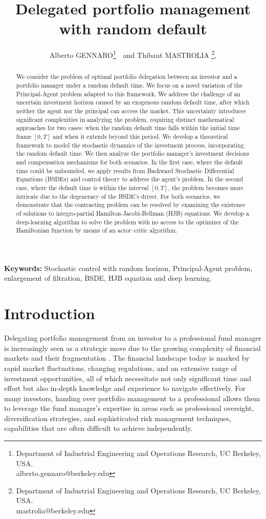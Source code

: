 \documentclass[11pt,a4paper]{article}
\title{Delegated portfolio management with random default}
\author{Alberto {\sc GENNARO}\footnote{ Department of Industrial Engineering and Operations Research, UC Berkeley, USA.\\ alberto.gennaro@berkeley.edu}~~and Thibaut {\sc MASTROLIA} \footnote{ Department of Industrial Engineering and Operations Research, UC Berkeley, USA.\\ mastrolia@berkeley.edu},}
\theoremstyle{thmstyleone}%
\theoremstyle{thmstyletwo}%
\theoremstyle{thmstylethree}%
\begin{document}
\maketitle
\begin{abstract}


We consider the problem of optimal portfolio delegation between an investor and a portfolio manager under a random default time. We focus on a novel variation of the Principal-Agent problem adapted to this framework. We address the challenge of an uncertain investment horizon caused by an exogenous random default time, after which neither the agent nor the principal can access the market. This uncertainty introduces significant complexities in analyzing the problem, requiring distinct mathematical approaches for two cases: when the random default time falls within the initial time frame $[0, T]$ and when it extends beyond this period. We develop a theoretical framework to model the stochastic dynamics of the investment process, incorporating the random default time. We then analyze the portfolio manager's investment decisions and compensation mechanisms for both scenarios. In the first case, where the default time could be unbounded, we apply results from Backward Stochastic Differential Equations (BSDEs) and control theory to address the agent's problem. In the second case, where the default time is within the interval $[0, T]$, the problem becomes more intricate due to the degeneracy of the BSDE's driver. For both scenarios, we demonstrate that the contracting problem can be resolved by examining the existence of solutions to integro-partial Hamilton-Jacobi-Bellman (HJB) equations. We develop a deep-learning algorithm to solve the problem with no access to the optimizer of the Hamiltonian function by means of an actor--critic algorithm.  
\end{abstract}
\textbf{Keywords: }{Stochastic control with random horizon, Principal-Agent problem, enlargement of filtration, BSDE, HJB equation and deep learning.}






\section{Introduction}\label{sec1}


Delegating portfolio management from an investor to a professional fund manager is increasingly seen as a strategic move due to the growing complexity of financial markets and their fragmentation \cite{jensen1968performance,bernstein1998investment,stracca2006delegated}. The financial landscape today is marked by rapid market fluctuations, changing regulations, and an extensive range of investment opportunities, all of which necessitate not only significant time and effort but also in-depth knowledge and experience to navigate effectively. For many investors, handing over portfolio management to a professional allows them to leverage the fund manager’s expertise in areas such as professional oversight, diversification strategies, and sophisticated risk management techniques, capabilities that are often difficult to achieve independently.\\
\end{document}
